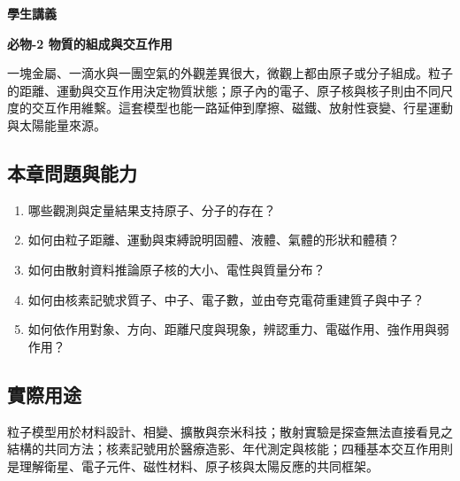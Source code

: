 \documentclass[11pt,a4paper]{article}
\providecommand{\tightlist}{%
  \setlength{\itemsep}{0pt}\setlength{\parskip}{0pt}}
\begin{document}
\begin{tcolorbox}[
  enhanced,colback=white,colframe=HandoutBlue,boxrule=1.1pt,arc=2mm,
  borderline west={3pt}{0pt}{HandoutBlue},left=5mm,right=4mm,top=4mm,bottom=4mm
]
{\sffamily\small\bfseries\color{HandoutBlue}學生講義}\par
{\sffamily\bfseries\LARGE\color{HandoutInk}必物-2 物質的組成與交互作用}\par
\vspace{0.35em}{\large 由可觀測證據建立粒子模型，再以四種基本交互作用連結原子、材料與天體}\par
{}\par
{}\par
\end{tcolorbox}


一塊金屬、一滴水與一團空氣的外觀差異很大，微觀上都由原子或分子組成。粒子的距離、運動與交互作用決定物質狀態；原子內的電子、原子核與核子則由不同尺度的交互作用維繫。這套模型也能一路延伸到摩擦、磁鐵、放射性衰變、行星運動與太陽能量來源。

\begin{HandoutLearningMap}

\subsection{本章問題與能力}\label{ux672cux7ae0ux554fux984cux8207ux80fdux529b}

\begin{enumerate}
\def\labelenumi{\arabic{enumi}.}
\tightlist
\item
  哪些觀測與定量結果支持原子、分子的存在？
\item
  如何由粒子距離、運動與束縛說明固體、液體、氣體的形狀和體積？
\item
  如何由散射資料推論原子核的大小、電性與質量分布？
\item
  如何由核素記號求質子、中子、電子數，並由夸克電荷重建質子與中子？
\item
  如何依作用對象、方向、距離尺度與現象，辨認重力、電磁作用、強作用與弱作用？
\end{enumerate}

\subsection{實際用途}\label{ux5be6ux969bux7528ux9014}

粒子模型用於材料設計、相變、擴散與奈米科技；散射實驗是探查無法直接看見之結構的共同方法；核素記號用於醫療造影、年代測定與核能；四種基本交互作用則是理解衛星、電子元件、磁性材料、原子核與太陽反應的共同框架。

\end{HandoutLearningMap}
\end{document}
